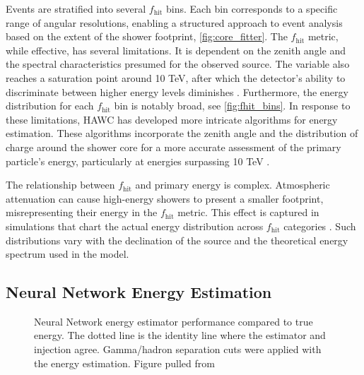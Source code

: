 Events are stratified into several $f_{\text{hit}}$ bins.
Each bin corresponds to a specific range of angular resolutions, enabling a structured approach to event analysis based on the extent of the shower footprint, \cref{fig:core_fitter}.
The $f_{\text{hit}}$ metric, while effective, has several limitations.
It is dependent on the zenith angle and the spectral characteristics presumed for the observed source.
The variable also reaches a saturation point around 10 TeV, after which the detector's ability to discriminate between higher energy levels diminishes \cite{Abeysekara_2017}.
Furthermore, the energy distribution for each $f_{\text{hit}}$ bin is notably broad, see \cref{fig:fhit_bins}.
In response to these limitations, HAWC has developed more intricate algorithms for energy estimation.
These algorithms incorporate the zenith angle and the distribution of charge around the shower core for a more accurate assessment of the primary particle's energy, particularly at energies surpassing 10 TeV \cite{wcd_Sensitivity}.

The relationship between $f_{\text{hit}}$ and primary energy is complex.
Atmospheric attenuation can cause high-energy showers to present a smaller footprint, misrepresenting their energy in the $f_{\text{hit}}$ metric.
This effect is captured in simulations that chart the actual energy distribution across $f_{\text{hit}}$ categories \cite{wcd_Sensitivity}.
Such distributions vary with the declination of the source and the theoretical energy spectrum used in the model.

\subsection{Neural Network Energy Estimation}\label{sec:hawc_nn}

\begin{figure}
    \caption{Neural Network energy estimator performance compared to true energy. The dotted line is the identity line where the estimator and injection agree. Gamma/hadron separation cuts were applied with the energy estimation. Figure pulled from \cite{100TEV_Crab_HAWC}}
    \label{fig:NN_performance}
\end{figure}

